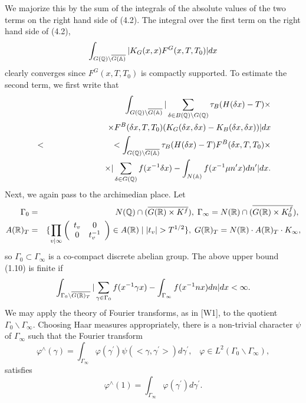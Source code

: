 We majorize this by the sum of the integrals of the absolute values of the
two terms on the right hand side of (4.2). The integral over the first term
on the right hand side of (4.2), 
\[
\int_{G({\Bbb{Q}})\backslash \overline{G({\Bbb{A}})}}|K_G(x,x)F^G(x,T,T_0)|dx 
\]
clearly converges since $F^G(x,T,T_0)$ is compactly supported. To estimate
the second term, we first write that 
\begin{eqnarray}
&&\int_{G({\Bbb{Q}})\backslash \overline{G({\Bbb{A}})}}|
\sum_{\delta \in B({\Bbb{Q}})\backslash G({\Bbb{Q}})}
\tau _B(H(\delta x)-T)\times \\
&&\;\;\;\;\;\;\;\;\;\;\;\;\;\;\;\;\;\;\;\;\times F^B(\delta
x,T,T_0)(K_G(\delta x,\delta x)-K_B(\delta x,\delta x))|dx \\
&<&<\int_{G({\Bbb{Q}})\backslash \overline{G({\Bbb{A}})}}
\tau _B(H(\delta x)-T)F^B(\delta x,T,T_0)\times  \nonumber \\
&&\;\;\;\;\;\;\;\;\;\;\;\;\;\;\;\;\;\;\;\;\;\;\;\times
|\sum_{\delta \in G({\Bbb{Q}})}f(x^{-1}\delta x)
-\int_{N({\Bbb{A}})}f(x^{-1}\mu n^{\prime }x)dn^{\prime }|dx.
\end{eqnarray}
Next, we again pass to the archimedian place. Let 
\begin{eqnarray}
\Gamma _0 &=&N({\Bbb{Q}})\cap (\overline{G({\Bbb{R}})\times K^f}),
\;\Gamma_\infty
=N({\Bbb{R}})\cap (\overline{G({\Bbb{R}})\times K_0^f}),\; \\
A({\Bbb{R}})_T &=&\{\prod_{v|\infty}
\left( 
\begin{array}{cc}
t_v & 0 \\ 
0 & t_v^{-1}
\end{array}
\right) \in A({\Bbb{R}})\;|\;|t_v|>T^{1/2}\},
\;G({\Bbb{R}})_T=N({\Bbb{R}})\cdot A({\Bbb{R}})_T\cdot K_\infty ,  
\nonumber
\end{eqnarray}
so $\Gamma _0\subset \Gamma _\infty $ is a co-compact discrete abelian
group. The above upper bound (1.10) is finite if 
\begin{equation}
\int_{\Gamma _0\backslash \overline{G({\Bbb{R}})_T}}|\sum_{\gamma \in \Gamma
_0}f(x^{-1}\gamma x)-\int_{\Gamma _\infty }f(x^{-1}nx)dn|dx<\infty .
\end{equation}
We may apply the theory of Fourier transforms, as in [W1], to the 
quotient $\Gamma _0\backslash \Gamma _\infty $. 
Choosing Haar measures appropriately,
there is a non-trivial character 
$\psi $ of $\Gamma _\infty $ such that the Fourier transform 
\[
\varphi ^{\wedge }(\gamma )
=\int_{\Gamma _\infty }\varphi (\gamma ^{\prime})
\psi (<\gamma ,\gamma ^{\prime }>)d\gamma ^{\prime },
\;\;\;\varphi \in L^2(\Gamma _0\backslash \Gamma _\infty ), 
\]
satisfies 
\[
\varphi ^{\wedge }(1)=\int_{\Gamma _\infty }\varphi (\gamma ^{\prime
})d\gamma ^{\prime }. 
\]

